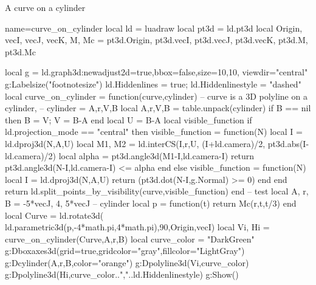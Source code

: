 \begin{demo}{A curve on a cylinder}
\begin{luadraw}{name=curve_on_cylinder}
local ld = luadraw
local pt3d = ld.pt3d
local Origin, vecI, vecJ, vecK, M, Mc = pt3d.Origin, pt3d.vecI, pt3d.vecJ, pt3d.vecK, pt3d.M, pt3d.Mc

local g = ld.graph3d:new{adjust2d=true,bbox=false,size={10,10}, viewdir="central"}
g:Labelsize("footnotesize")
ld.Hiddenlines = true; ld.Hiddenlinestyle = "dashed"
local curve_on_cylinder = function(curve,cylinder)
-- curve is a 3D polyline on a cylinder,
-- cylinder = {A,r,V,B}
    local A,r,V,B = table.unpack(cylinder)
    if B == nil then B = V; V = B-A end
    local U = B-A
    local visible_function
    if ld.projection_mode == "central" then
        visible_function = function(N)
            local I = ld.dproj3d(N,{A,U})
            local M1, M2 = ld.interCS({I,r,U},{ (I+ld.camera)/2, pt3d.abs(I-ld.camera)/2})
            local alpha = pt3d.angle3d(M1-I,ld.camera-I)
            return pt3d.angle3d(N-I,ld.camera-I) <= alpha
        end
    else
        visible_function = function(N)
            local I = ld.dproj3d(N,{A,U})
            return (pt3d.dot(N-I,g.Normal) >= 0)
        end
    end
    return ld.split_points_by_visibility(curve,visible_function)
end
-- test
local A, r, B = -5*vecJ, 4, 5*vecJ -- cylinder
local p = function(t) return Mc(r,t,t/3) end
local Curve = ld.rotate3d( ld.parametric3d(p,-4*math.pi,4*math.pi),90,{Origin,vecI})
local Vi, Hi = curve_on_cylinder(Curve,{A,r,B})
local curve_color = "DarkGreen"
g:Dboxaxes3d({grid=true,gridcolor="gray",fillcolor="LightGray"})
g:Dcylinder(A,r,B,{color="orange"})
g:Dpolyline3d(Vi,curve_color)
g:Dpolyline3d(Hi,curve_color..","..ld.Hiddenlinestyle)
g:Show()
\end{luadraw}
\end{demo}
